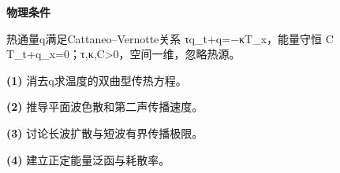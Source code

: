 \textbf{物理条件}\par 热通量q满足Cattaneo–Vernotte关系 τq\_t+q=−κT\_x，能量守恒 C T\_t+q\_x=0；τ,κ,C>0，空间一维，忽略热源。
\par\noindent\textbf{(1)} 消去q求温度的双曲型传热方程。
\par\noindent\textbf{(2)} 推导平面波色散和第二声传播速度。
\par\noindent\textbf{(3)} 讨论长波扩散与短波有界传播极限。
\par\noindent\textbf{(4)} 建立正定能量泛函与耗散率。
